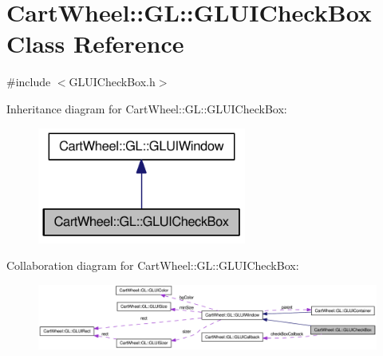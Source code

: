 \hypertarget{classCartWheel_1_1GL_1_1GLUICheckBox}{
\section{CartWheel::GL::GLUICheckBox Class Reference}
\label{classCartWheel_1_1GL_1_1GLUICheckBox}
}


{\ttfamily \#include $<$GLUICheckBox.h$>$}



Inheritance diagram for CartWheel::GL::GLUICheckBox:\nopagebreak
\begin{figure}[H]
\begin{center}
\leavevmode
\includegraphics[width=194pt]{classCartWheel_1_1GL_1_1GLUICheckBox__inherit__graph}
\end{center}
\end{figure}


Collaboration diagram for CartWheel::GL::GLUICheckBox:\nopagebreak
\begin{figure}[H]
\begin{center}
\leavevmode
\includegraphics[width=400pt]{classCartWheel_1_1GL_1_1GLUICheckBox__coll__graph}
\end{center}
\end{figure}

